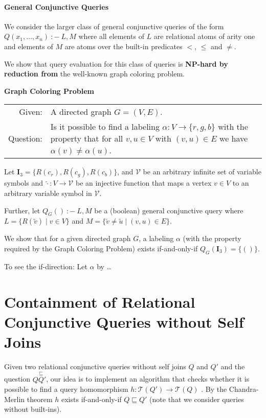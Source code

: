 \documentclass[a4paper,12pt]{article}
\newcommand{\dbi}{\ensuremath{\mathbf{I}}}
\newcommand{\query}[3]{\ensuremath{{#1}({#2})\:{:}{-}\:{#3}}}
\begin{document}
\paragraph{General Conjunctive Queries}{We consider the larger class of general conjunctive queries of the form $\query{Q}{x_1, \dots, x_n}{L,M}$ where all elements of $L$ are relational atoms of arity one and elements of $M$ are atoms over the built-in predicates $<$, $\leq$ and $\not =$.

We show that query evaluation for this class of queries is \textbf{NP-hard by reduction from} the well-known graph coloring problem.

\begin{center}
\textbf{Graph Coloring Problem}\\[1mm]
\begin{tabular}{rp{14cm}}
Given: & A directed graph $G = (V, E)$. \\
Question: & Is it possible to find a labeling $\alpha : V \rightarrow \{r, g, b\}$ with the property that for all $v, u \in V$ with $(v, u) \in E$ we have $\alpha(v) \not = \alpha(u)$.
\end{tabular}
\end{center}

Let $\dbi_{3} = \{ R(c_r), R(c_g), R(c_b) \}$, and $\mathcal{V}$ be an arbitrary infinite set of variable symbols and $\tilde{\cdot} : V \rightarrow \mathcal{V}$ be an injective function that maps a vertex $v \in V$ to an arbitrary variable symbol in $\mathcal{V}$.

Further, let $\query{Q_G}{}{L,M}$ be a (boolean) general conjunctive query where $L = \{ R(\tilde{v}) \mid v \in V \}$ and $M = \{ \tilde{v} \not = \tilde{u} \mid (v, u) \in E\}$.

We show that for a given directed graph $G$, a labeling $\alpha$ (with the property required by the Graph Coloring Problem) exists if-and-only-if $Q_G(\dbi_3)
 = \{ () \}$.

To see the if-direction: Let $\alpha$ by \dots

\section{Containment of Relational Conjunctive Queries without Self Joins}

Given two relational conjunctive queries without self joins $Q$ and $Q'$ and the question $Q \stackrel{\sqsubseteq} Q'$, our idea is to implement an algorithm that checks whether it is possible to find a query homomorphism $h : \mathcal{T}(Q') \rightarrow \mathcal{T}(Q)$ . By the Chandra-Merlin theorem $h$ exists if-and-only-if $Q \sqsubseteq Q'$ (note that we consider queries without built-ins).

}
\end{document}
